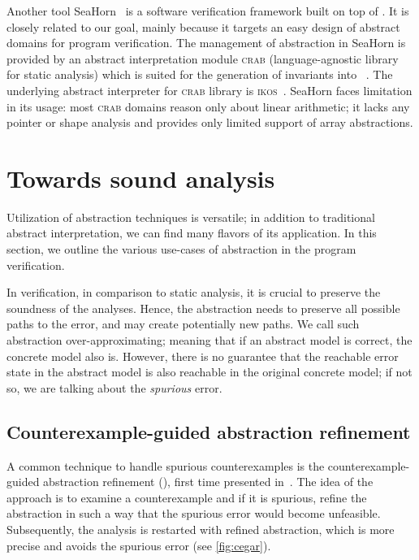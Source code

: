 Another tool SeaHorn~\cite{Gurfinkel2015} is a software verification framework
built on top of \llvm.  It is closely related to our goal, mainly because it
targets an easy design of abstract domains for program verification. The
management of abstraction in SeaHorn is provided by an abstract interpretation
module \textsc{crab} (language-agnostic library for static analysis) which is
suited for the generation of invariants into \llvm~\cite{Gershuni2019}. The
underlying abstract interpreter for \textsc{crab} library is
\textsc{ikos}~\cite{Ikos}. SeaHorn faces limitation in its usage: most
\textsc{crab} domains reason only about linear arithmetic; it lacks any pointer
or shape analysis and provides only limited support of array abstractions.

\section{Towards sound analysis}
\label{sec:techniques}

Utilization of abstraction techniques is versatile; in addition to traditional
abstract interpretation, we can find many flavors of its application. In this
section, we outline the various use-cases of abstraction in the program
verification.

In verification, in comparison to static analysis, it is crucial to preserve
the soundness of the analyses. Hence, the abstraction needs to preserve all
possible paths to the error, and may create potentially new paths. We call such
abstraction over-approximating; meaning that if an abstract model is correct,
the concrete model also is.  However, there is no guarantee that the reachable
error state in the abstract model is also reachable in the original concrete
model; if not so, we are talking about the \emph{spurious} error.

\subsection{Counterexample-guided abstraction refinement}

A common technique to handle spurious coun\-ter\-examples is the
coun\-ter\-example-guided abstraction refinement (\cegar), first time presented
in~\cite{Clarke2000}. The idea of the \cegar approach is to examine a
counterexample and if it is spurious, refine the abstraction in such a way that
the spurious error would become unfeasible. Subsequently, the analysis is
restarted with refined abstraction, which is more precise and avoids the
spurious error (see \autoref{fig:cegar}).


